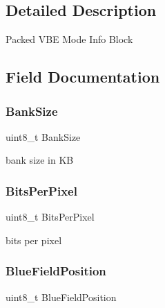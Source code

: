 \subsection{Detailed Description}
Packed V\+BE Mode Info Block 

\subsection{Field Documentation}
\hypertarget{structvbe__mode__info__t_a7e31ea09e6e6755e3a504b9c76b3f545}{}\label{structvbe__mode__info__t_a7e31ea09e6e6755e3a504b9c76b3f545} 
\subsubsection{\texorpdfstring{Bank\+Size}{BankSize}}
{\footnotesize\ttfamily uint8\+\_\+t Bank\+Size}



bank size in KB 

\hypertarget{structvbe__mode__info__t_a03756ae144fce823087a2a4255bf4bb1}{}\label{structvbe__mode__info__t_a03756ae144fce823087a2a4255bf4bb1} 
\subsubsection{\texorpdfstring{Bits\+Per\+Pixel}{BitsPerPixel}}
{\footnotesize\ttfamily uint8\+\_\+t Bits\+Per\+Pixel}



bits per pixel 

\hypertarget{structvbe__mode__info__t_a4d0396c07a4f07556332fec2b4a6c2bf}{}\label{structvbe__mode__info__t_a4d0396c07a4f07556332fec2b4a6c2bf} 
\subsubsection{\texorpdfstring{Blue\+Field\+Position}{BlueFieldPosition}}
{\footnotesize\ttfamily uint8\+\_\+t Blue\+Field\+Position}




